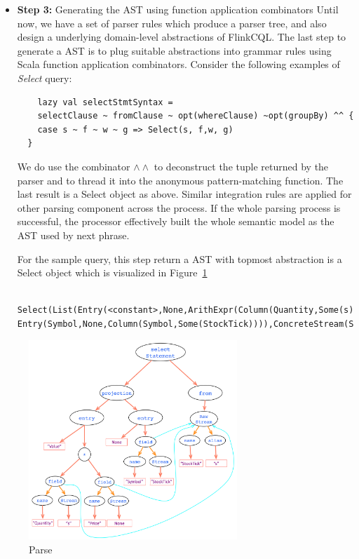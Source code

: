 \begin{itemize}
\begin{lstlisting}
	case class Entry[T](name: String, alias: Option[String], expr: Expr[T])
\end{lstlisting}

Hence, we are able to build up a complete semantic model for FlinkCQL using top-down approach.


\item \textbf{Step 3:} Generating the AST using function application combinators
Until now, we have a set of parser rules which produce a parser tree, and also design a underlying domain-level abstractions of FlinkCQL. The last step to generate a AST is to plug suitable abstractions into grammar rules using Scala function application combinators. Consider the following examples of \textit{Select} query:

\begin{lstlisting}
	lazy val selectStmtSyntax = 
	selectClause ~ fromClause ~ opt(whereClause) ~opt(groupBy) ^^ {
    case s ~ f ~ w ~ g => Select(s, f,w, g)
  }
\end{lstlisting}

We do use the combinator $\wedge \wedge$ to deconstruct the tuple returned by the parser and to thread it into the anonymous pattern-matching function. The last result is a Select object as above. Similar integration rules are applied for other parsing component across the process. 
If the whole parsing process is successful, the processor effectively built the whole semantic model as the AST used by next phrase.

For the sample query, this step return a AST with topmost abstraction is a Select object which is visualized in Figure~\ref{fig:Parse}

\begin{lstlisting}	Select(List(Entry(<constant>,None,ArithExpr(Column(Quantity,Some(s)),*,Column(Price,None))), Entry(Symbol,None,Column(Symbol,Some(StockTick)))),ConcreteStream(Stream(StockTick,Some(s),false),None,None),None,None)
\end{lstlisting}
 

\end{itemize}


\begin{figure}[h!] 
\centering    
\includegraphics[width=0.7\textwidth]{Parse}
\caption{Parse}
\label{fig:Parse}
\end{figure}


